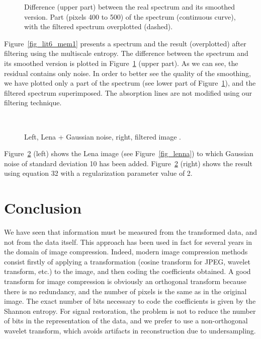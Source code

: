 \documentclass[11pt,a4paper]{article}
\begin{document}
\begin{figure}[htb]
\centerline{
\vbox{ 
}}
\caption{Difference (upper part) 
between the real spectrum and its smoothed version.
Part (pixels 400 to 500) of the spectrum (continuous curve), 
with the filtered spectrum
overplotted (dashed).}
\label{fig_lit6_mem2}
\end{figure}
Figure~\ref{fig_lit6_mem1} presents a spectrum and the result (overplotted)
after filtering using the multiscale entropy. The difference between the
spectrum and its smoothed version is plotted in 
Figure~\ref{fig_lit6_mem2} (upper part). 
As we can see, the residual contains only noise.
In order to better see the quality of the smoothing, we have plotted
only a part of the spectrum (see lower part of Figure~\ref{fig_lit6_mem2}),
and the filtered spectrum superimposed. The absorption lines are not 
modified using our filtering technique. 

\begin{figure}[h]
\centerline{
\hbox{
}}
\caption{Left, Lena + Gaussian noise, right, filtered image .}
\label{fig_filter_gauss_noise}
\end{figure}
Figure~\ref{fig_filter_gauss_noise} (left) shows the Lena image 
(see Figure~\ref{fig_lenna}) to which Gaussian 
noise of standard deviation 10 has been added.  Figure~\ref{fig_filter_gauss_noise} (right) shows 
the result using equation 32 with a regularization parameter value of 2.  

\section{Conclusion}

We have seen that information must be measured from the transformed
data, and not from the data itself. This approach has been used in fact
for several years in the domain of image compression. Indeed, modern
image compression methods consist firstly of  applying a transformation 
(cosine transform for JPEG, wavelet transform, etc.) to the image, and
then coding the coefficients obtained. A good transform for
image compression is obviously an orthogonal transform because there
is no redundancy, and the number of pixels is the same as in the original
image. The exact number of bits necessary to code the coefficients is
given by the Shannon entropy. For signal restoration, the problem is
not to reduce the number of bits in the representation of the data, and we
prefer to use a non-orthogonal wavelet transform, which avoids
artifacts in reconstruction due to undersampling. 
\end{document}
